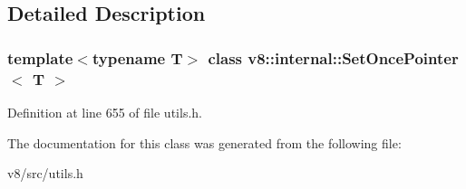 \subsection{Detailed Description}
\subsubsection*{template$<$typename T$>$\newline
class v8\+::internal\+::\+Set\+Once\+Pointer$<$ T $>$}



Definition at line 655 of file utils.\+h.



The documentation for this class was generated from the following file\+:\begin{DoxyCompactItemize}
\item 
v8/src/utils.\+h\end{DoxyCompactItemize}
